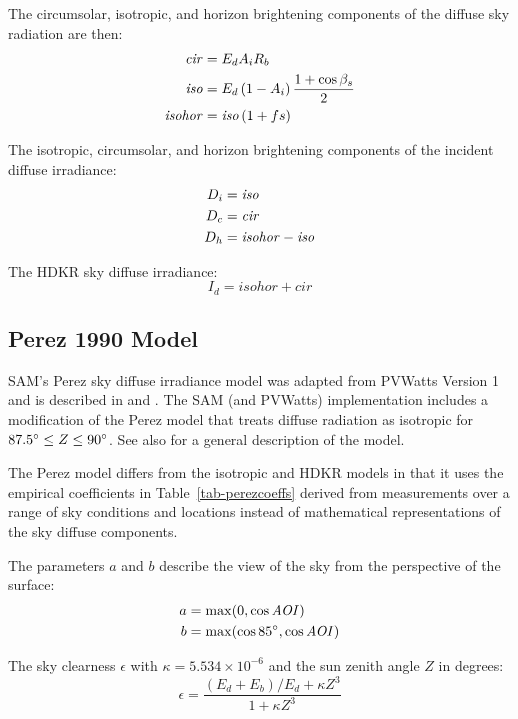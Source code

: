 \documentclass[12pt,letterpaper]{article}
\newcommand\AOI{\ensuremath{\mathit{AOI}}}
\begin{document}
The circumsolar, isotropic, and horizon brightening components of the diffuse sky radiation are then:
\begin{align}
\mathit{cir} &= E_d A_i R_b \notag\\
\mathit{iso} &= E_d \left( 1 - A_i \right) \frac{1 + \cos \beta_s}{2} \notag\\
\mathit{isohor} &= \mathit{iso} \left( 1 + f s \right)
\end{align}

The isotropic, circumsolar, and horizon brightening components of the incident diffuse irradiance:
\begin{align}
D_i &= \mathit{iso} \notag\\
D_c &= \mathit{cir} \notag\\
D_h &= \mathit{isohor} - \mathit{iso}
\end{align}

The HDKR sky diffuse irradiance:
\begin{equation}
I_d = \mathit{isohor} + \mathit{cir}
\end{equation}

\subsection{Perez 1990 Model}\label{sec-perez}

SAM's Perez sky diffuse irradiance model was adapted from PVWatts Version 1 \citep{dobos2013a} and is described in \citet{perez1988} and \citep{perez1990}. The SAM (and PVWatts) implementation includes a modification of the Perez model that treats diffuse radiation as isotropic for $87.5\degree \leq Z \leq 90\degree$. See also \citep{pvmcperez} for a general description of the model.

The Perez model differs from the isotropic and HDKR models in that it uses the empirical  coefficients in Table~\ref{tab-perezcoeffs} derived from measurements over a range of sky conditions and locations instead of mathematical representations of the sky diffuse components.

The parameters $a$ and $b$ describe the view of the sky from the perspective of the surface:
\begin{align}
a &= \max( 0, \cos\AOI ) \notag\\
b & =\max( \cos85\degree, \cos\AOI) 
\end{align}

The sky clearness $\epsilon$ with $\kappa=5.534\times10^{-6}$ and the sun zenith angle
 $Z$ in degrees:
\begin{equation}\label{eqn-perezepsilon}
\epsilon =\frac{(E_d + E_b ) / E_d + \kappa Z^{3} }{1 +  \kappa Z^{3}}
\end{equation}
\end{document}
